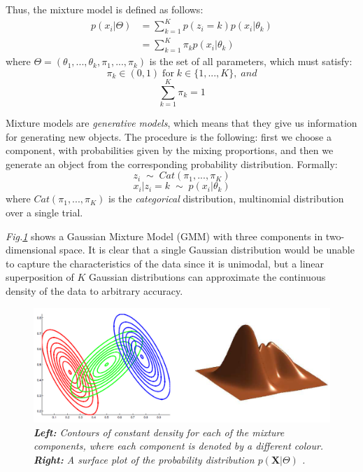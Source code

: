 Thus, the mixture model is defined as follows:
\begin{equation} \label{mix-model-f-mm}
	\begin{aligned}
		p(x_{i}|\Theta) & = \sum_{k=1}^{K} p(z_{i} = k) p(x_{i}|\theta_{k}) \\
			& = \sum_{k=1}^{K}\pi_{k} p(x_{i}|\theta_{k}) 
	\end{aligned}
\end{equation}
where $\Theta = (\theta_{1},..., \theta_{k}, \pi_{1},..., \pi_{k})$ is the set of all parameters, which must satisfy:
\begin{equation}
		\pi_{k} \in (0, 1) \; \text{for} \; k \in \lbrace 1,...,K \rbrace, \; and 
\end{equation}
\begin{equation}
		\sum_{k=1}^{K}\pi_{k} = 1 
\end{equation}

Mixture models are \emph{generative models}, which means that they give us information for generating new objects. The procedure is the following: first we choose a component, with probabilities given by the mixing proportions, and then we generate an object from the corresponding probability distribution. Formally:
\begin{equation}
		z_{i} \; \sim \; Cat(\pi_{1},...,\pi_{K})
\end{equation}
\begin{equation}
		x_{i} | z_{i}=k \; \sim \; p(x_{i}|\theta_{k})
\end{equation}
where $Cat(\pi_{1},...,\pi_{K})$ is the \emph{categorical} distribution, \ie multinomial distribution over a single trial.

\emph{Fig.\ref{gmm-pic}} shows a Gaussian Mixture Model (GMM) with three components in two-dimensional space. It is clear that a single Gaussian distribution would be unable to capture the characteristics of the data since it is unimodal, but a linear superposition of $K$ Gaussian distributions can approximate the continuous density of the data to arbitrary accuracy. 

\begin{figure}[!h]
	\begin{center}
 		\includegraphics[scale = 0.43]{images/gmm.png}
		 	  \caption{\emph{\textbf{Left:} Contours of constant density for each of the mixture components, where each component is denoted by a different colour. \textbf{Right:} A surface plot of the probability distribution $p(\mathbf{X}|\Theta)$ \cite[Ch. \ 2]{Bishop2006}.}}
		\label{gmm-pic}
	\end{center}
\end{figure}


